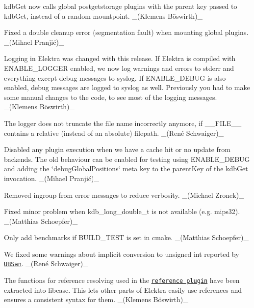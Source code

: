 \begin{DoxyItemize}
\item {\ttfamily kdb\+Get} now calls global postgetstorage plugins with the parent key passed to {\ttfamily kdb\+Get}, instead of a random mountpoint. \+\_\+(Klemens Böswirth)\+\_\+
\item Fixed a double cleanup error (segmentation fault) when mounting global plugins. \+\_\+(Mihael Pranjić)\+\_\+
\item Logging in Elektra was changed with this release. If Elektra is compiled with {\ttfamily E\+N\+A\+B\+L\+E\+\_\+\+L\+O\+G\+G\+ER} enabled, we now log warnings and errors to stderr and everything except debug messages to syslog. If {\ttfamily E\+N\+A\+B\+L\+E\+\_\+\+D\+E\+B\+UG} is also enabled, debug messages are logged to syslog as well. Previously you had to make some manual changes to the code, to see most of the logging messages. \+\_\+(Klemens Böswirth)\+\_\+
\item The logger does not truncate the file name incorrectly anymore, if {\ttfamily \+\_\+\+\_\+\+F\+I\+L\+E\+\_\+\+\_\+} contains a relative (instead of an absolute) filepath. \+\_\+(René Schwaiger)\+\_\+
\item Disabled any plugin execution when we have a cache hit or no update from backends. The old behaviour can be enabled for testing using {\ttfamily E\+N\+A\+B\+L\+E\+\_\+\+D\+E\+B\+UG} and adding the {\ttfamily \char`\"{}debug\+Global\+Positions\char`\"{}} meta key to the parent\+Key of the kdb\+Get invocation. \+\_\+(Mihael Pranjić)\+\_\+
\item Removed {\ttfamily ingroup} from error messages to reduce verbosity. \+\_\+(\+Michael Zronek)\+\_\+
\item Fixed minor problem when {\ttfamily kdb\+\_\+long\+\_\+double\+\_\+t} is not available (e.\+g. mips32). \+\_\+(\+Matthias Schoepfer)\+\_\+
\item Only add benchmarks if {\ttfamily B\+U\+I\+L\+D\+\_\+\+T\+E\+ST} is set in cmake. \+\_\+(\+Matthias Schoepfer)\+\_\+
\item We fixed some warnings about implicit conversion to {\ttfamily unsigned int} reported by \href{https://clang.llvm.org/docs/UndefinedBehaviorSanitizer.html}{\tt U\+B\+San}. \+\_\+(René Schwaiger)\+\_\+
\end{DoxyItemize}


\begin{DoxyItemize}
\item The functions for reference resolving used in the \href{https://www.libelektra.org/plugins/reference}{\tt reference plugin} have been extracted into libease. This lets other parts of Elektra easily use references and ensures a consistent syntax for them. \+\_\+(Klemens Böswirth)\+\_\+
\end{DoxyItemize}

